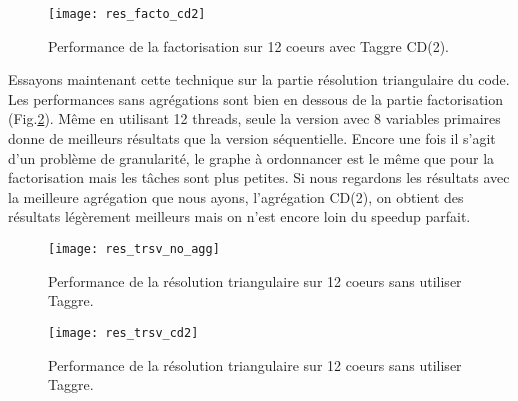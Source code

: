 \begin{figure}[t!]
  \centering
  \texttt{[image: res\_facto\_cd2]}
  \caption{Performance de la factorisation sur 12 coeurs avec Taggre CD(2).}
  \label{fig:res_facto_cd2}
\end{figure}

Essayons maintenant cette technique sur la partie résolution triangulaire du code.
%
Les performances sans agrégations sont bien en dessous de la partie factorisation (Fig.\ref{fig:res_trsv_no_agg}).
%
Même en utilisant 12 threads, seule la version avec 8 variables primaires donne de meilleurs résultats que la version séquentielle.
%
Encore une fois il s'agit d'un problème de granularité, le graphe à ordonnancer est le même que pour la factorisation mais les tâches sont plus petites.
%
Si nous regardons les résultats avec la meilleure agrégation que nous ayons, l'agrégation CD(2), on obtient des résultats légèrement meilleurs mais on n'est encore loin du speedup parfait.

\begin{figure}[t!]
  \centering
  \texttt{[image: res\_trsv\_no\_agg]}
  \caption{Performance de la résolution triangulaire sur 12 coeurs sans utiliser Taggre.}
  \label{fig:res_trsv_no_agg}
\end{figure}


\begin{figure}[t!]
  \centering
  \texttt{[image: res\_trsv\_cd2]}
  \caption{Performance de la résolution triangulaire sur 12 coeurs sans utiliser Taggre.}
  \label{fig:res_trsv_cd2}
\end{figure}

